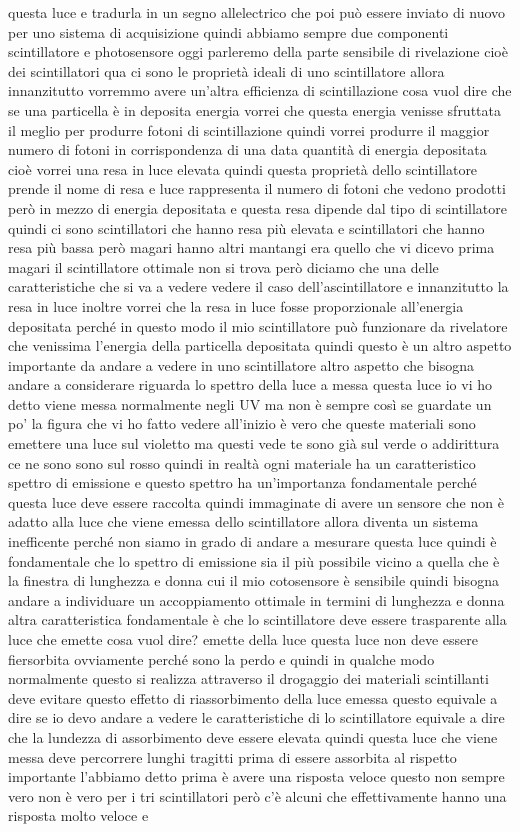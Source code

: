 {questa luce e tradurla in un segno allelectrico che poi può essere inviato di nuovo per uno sistema di acquisizione quindi abbiamo sempre due componenti scintillatore e photosensore oggi parleremo della parte sensibile di rivelazione cioè dei scintillatori qua ci sono le proprietà ideali di uno scintillatore allora innanzitutto vorremmo avere un'altra efficienza di scintillazione cosa vuol dire che se una particella è in deposita energia vorrei che questa energia venisse sfruttata il meglio per produrre fotoni di scintillazione quindi vorrei produrre il maggior numero di fotoni in corrispondenza di una data quantità di energia depositata cioè vorrei una resa in luce elevata quindi questa proprietà dello scintillatore prende il nome di resa e luce rappresenta il numero di fotoni che vedono prodotti però in mezzo di energia depositata e questa resa dipende dal tipo di scintillatore quindi ci sono scintillatori che hanno resa più elevata e scintillatori che hanno resa più bassa però magari hanno altri mantangi era quello che vi dicevo prima magari il scintillatore ottimale non si trova però diciamo che una delle caratteristiche che si va a vedere vedere il caso dell'ascintillatore e innanzitutto la resa in luce inoltre vorrei che la resa in luce fosse proporzionale all'energia depositata perché in questo modo il mio scintillatore può funzionare da rivelatore che venissima l'energia della particella depositata quindi questo è un altro aspetto importante da andare a vedere in uno scintillatore altro aspetto che bisogna andare a considerare riguarda lo spettro della luce a messa questa luce io vi ho detto viene messa normalmente negli UV ma non è sempre così se guardate un po' la figura che vi ho fatto vedere all'inizio è vero che queste materiali sono emettere una luce sul violetto ma questi vede te sono già sul verde o addirittura ce ne sono sono sul rosso quindi in realtà ogni materiale ha un caratteristico spettro di emissione e questo spettro ha un'importanza fondamentale perché questa luce deve essere raccolta quindi immaginate di avere un sensore che non è adatto alla luce che viene emessa dello scintillatore allora diventa un sistema inefficente perché non siamo in grado di andare a mesurare questa luce quindi è fondamentale che lo spettro di emissione sia il più possibile vicino a quella che è la finestra di lunghezza e donna cui il mio cotosensore è sensibile quindi bisogna andare a individuare un accoppiamento ottimale in termini di lunghezza e donna altra caratteristica fondamentale è che lo scintillatore deve essere trasparente alla luce che emette cosa vuol dire? emette della luce questa luce non deve essere fiersorbita ovviamente perché sono la perdo e quindi in qualche modo normalmente questo si realizza attraverso il drogaggio dei materiali scintillanti deve evitare questo effetto di riassorbimento della luce emessa questo equivale a dire se io devo andare a vedere le caratteristiche di lo scintillatore equivale a dire che la lundezza di assorbimento deve essere elevata quindi questa luce che viene messa deve percorrere lunghi tragitti prima di essere assorbita al rispetto importante l'abbiamo detto prima è avere una risposta veloce questo non sempre vero non è vero per i tri scintillatori però c'è alcuni che effettivamente hanno una risposta molto veloce e }
